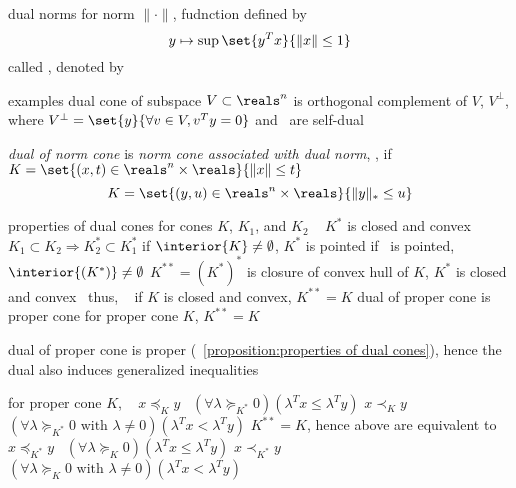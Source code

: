 \documentclass[17pt,landscape]{foils}
\begin{document}
{

\begin{mydefinition}{dual norms}
	for norm $\|\cdot\|$,
	fudnction defined by
	$$
		y \mapsto \sup \set{y^Tx}{\|x\|\leq 1}
	$$
	called ,
	denoted by 
\end{mydefinition}


\bit
\item
	examples
	\bit
	\vitem
		dual cone of subspace $V\subset \reals^n$
		is orthogonal complement of $V$, $V^\perp$,
		where
		$V^\perp=\set{y}{\forall v\in V,v^Ty = 0}$
	\vitem
		 and \ are self-dual

	\vitem
		\emph{dual of norm cone} is \emph{norm cone associated with dual norm},
		\ie,
		if $K=\set{(x,t)\in\reals^{n} \times \reals}{\|x\|\leq t}$
		$$
			K=\set{(y,u)\in\reals^{n} \times \reals}{\|y\|_\ast\leq u}
		$$
	\eit
\eit



\begin{myproposition}{properties of dual cones}
	for cones $K$, $K_1$, and $K_2$
	\shrinkspacewithintheoremslike\
	\ibit
	\iitem
		$K^\ast$ is closed and convex
	\iitem
		$K_1\subset K_2 \Rightarrow K_2^\ast \subset K_1^\ast$
	\iitem
		if $\interior{K} \neq \emptyset$, $K^\ast$ is pointed
	\iitem
		if \ is pointed, $\interior{(K^\ast)} \neq \emptyset$
	\iitem
		$K^{\ast\ast}=(K^\ast)^\ast$ is closure of convex hull of $K$,
	\iitem
		$K^\ast$ is closed and convex
	\eit
	\shrinkspacewithintheoremslike\
	thus,
	\shrinkspacewithintheoremslike\
	\ibit
	\iitem
		if $K$ is closed and convex, $K^{\ast\ast} = K$
	\iitem
		dual of proper cone is proper cone
	\iitem
		for proper cone $K$, $K^{\ast\ast}=K$
	\eit
\end{myproposition}



\bit
\item
	dual of proper cone is proper (\propositionname~\ref{proposition:properties of dual cones}),
	hence the dual also induces generalized inequalities
\eit

\begin{myproposition}{}
	\label{proposition:generalized inequalities and dual generalized inequalities}
	for proper cone $K$,
	\shrinkspacewithintheoremslike\
	\ibit
	\iitem
		$x\preceq_K y$ \iaoi\ $(\forall \lambda \succeq_{K^\ast} 0)(\lambda^T x \leq \lambda^T y)$
	\iitem
		$x\prec_K y$ \iaoi\ $(\forall \lambda \succeq_{K^\ast} 0 \mbox{ with } \lambda\neq0)(\lambda^T x < \lambda^T y)$
	\eit
	$K^{\ast\ast} = K$,
	hence
	above are equivalent to
	\shrinkspacewithintheoremslike\
	\ibit
	\iitem
		$x\preceq_{K^\ast} y$ \iaoi\ $(\forall \lambda \succeq_{K} 0)(\lambda^T x \leq \lambda^T y)$
	\iitem
		$x\prec_{K^\ast} y$ \iaoi\ $(\forall \lambda \succeq_{K} 0 \mbox{ with } \lambda\neq0)(\lambda^T x < \lambda^T y)$
	\eit
\end{myproposition}


}
\end{document}
